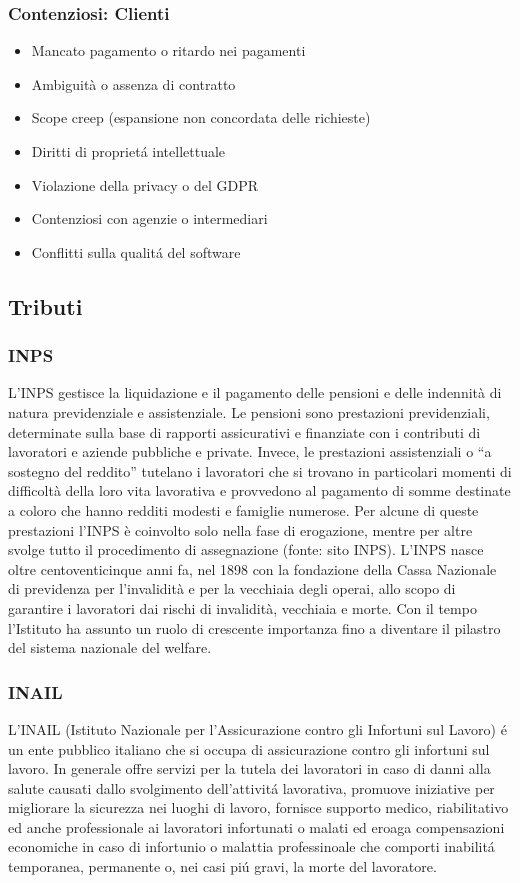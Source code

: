 \documentclass{article}
\begin{document}
\subsubsection{Contenziosi: Clienti}
\begin{itemize}
    \item Mancato pagamento o ritardo nei pagamenti
    \item Ambiguità o assenza di contratto
    \item Scope creep (espansione non concordata delle richieste)
    \item Diritti di propriet\'a intellettuale
    \item Violazione della privacy o del GDPR
    \item Contenziosi con agenzie o intermediari
    \item Conflitti sulla qualit\'a del software
\end{itemize}

\subsection{Tributi}

\subsubsection{INPS}
L’INPS gestisce la liquidazione e il pagamento delle pensioni e delle indennità di natura previdenziale e assistenziale. Le pensioni sono prestazioni previdenziali, determinate sulla base di rapporti assicurativi e finanziate con i contributi di lavoratori e aziende pubbliche e private. Invece, le prestazioni assistenziali o “a sostegno del reddito” tutelano i lavoratori che si trovano in particolari momenti di difficoltà della loro vita lavorativa e provvedono al pagamento di somme destinate a coloro che hanno redditi modesti e famiglie numerose. Per alcune di queste prestazioni l’INPS è coinvolto solo nella fase di erogazione, mentre per altre svolge tutto il procedimento di assegnazione (fonte: sito INPS). L’INPS nasce oltre centoventicinque anni fa, nel 1898 con la fondazione della Cassa Nazionale di previdenza per l'invalidità e per la vecchiaia degli operai, allo scopo di garantire i lavoratori dai rischi di invalidità, vecchiaia e morte. Con il tempo l’Istituto ha assunto un ruolo di crescente importanza fino a diventare il pilastro del sistema nazionale del welfare.

\subsubsection{INAIL}
L'INAIL (Istituto Nazionale per l'Assicurazione contro gli Infortuni sul Lavoro) \'e un ente pubblico italiano che si occupa di assicurazione contro gli infortuni sul lavoro.
In generale offre servizi per la tutela dei lavoratori in caso di danni alla salute causati dallo svolgimento dell'attivit\'a lavorativa, promuove iniziative per migliorare la sicurezza nei luoghi di lavoro, 
fornisce supporto medico, riabilitativo ed anche professionale ai lavoratori infortunati o malati ed eroaga compensazioni economiche in caso di infortunio o malattia professinoale che comporti inabilit\'a temporanea, permanente o, nei casi pi\'u gravi, la morte del lavoratore.
\end{document}
